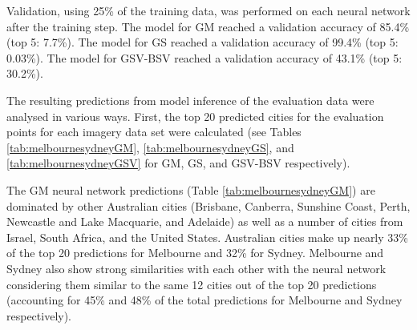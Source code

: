 \documentclass[sageh,times]{sagej}
\begin{document}
Validation, using 25\% of the training data, was performed on each neural network after the training step. The model for GM reached a validation accuracy of 85.4\% (top 5: 7.7\%). The model for GS reached a validation accuracy of 99.4\% (top 5: 0.03\%). The model for GSV-BSV reached a validation accuracy of 43.1\% (top 5: 30.2\%).

The resulting predictions from model inference of the evaluation data were analysed in various ways. First, the top 20 predicted cities for the evaluation points for each imagery data set were calculated (see Tables \ref{tab:melbournesydneyGM}, \ref{tab:melbournesydneyGS}, and \ref{tab:melbournesydneyGSV} for GM, GS, and GSV-BSV respectively).



The GM neural network predictions (Table \ref{tab:melbournesydneyGM}) are dominated by other Australian cities (Brisbane, Canberra, Sunshine Coast, Perth, Newcastle and Lake Macquarie, and Adelaide) as well as a number of cities from Israel, South Africa, and the United States. Australian cities make up nearly 33\% of the top 20 predictions for Melbourne and 32\% for Sydney. Melbourne and Sydney also show strong similarities with each other with the neural network considering them similar to the same 12 cities out of the top 20 predictions (accounting for 45\% and 48\% of the total predictions for Melbourne and Sydney respectively).
\end{document}
